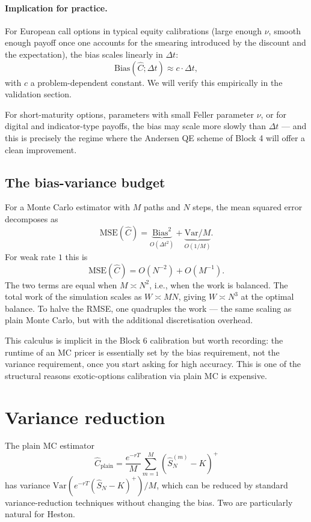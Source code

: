 \documentclass[11pt]{article}
\theoremstyle{plain}
\theoremstyle{definition}
\theoremstyle{remark}
\begin{document}
\paragraph{Implication for practice.} For European call options in typical equity calibrations (large enough $\nu$, smooth enough payoff once one accounts for the smearing introduced by the discount and the expectation), the bias scales linearly in $\Delta t$:
\[
    \mathrm{Bias}(\widehat C; \Delta t) \approx c \cdot \Delta t,
\]
with $c$ a problem-dependent constant. We will verify this empirically in the validation section.

For short-maturity options, parameters with small Feller parameter $\nu$, or for digital and indicator-type payoffs, the bias may scale more slowly than $\Delta t$ --- and this is precisely the regime where the Andersen QE scheme of Block 4 will offer a clean improvement.

\subsection{The bias-variance budget}

For a Monte Carlo estimator with $M$ paths and $N$ steps, the mean squared error decomposes as
\[
    \mathrm{MSE}(\widehat C) = \underbrace{\mathrm{Bias}^2}_{O(\Delta t^2)} + \underbrace{\mathrm{Var}/M}_{O(1/M)}.
\]
For weak rate $1$ this is
\[
    \mathrm{MSE}(\widehat C) = O(N^{-2}) + O(M^{-1}).
\]
The two terms are equal when $M \asymp N^2$, i.e., when the work is balanced. The total work of the simulation scales as $W \asymp M N$, giving $W \asymp N^3$ at the optimal balance. To halve the RMSE, one quadruples the work --- the same scaling as plain Monte Carlo, but with the additional discretisation overhead.

This calculus is implicit in the Block 6 calibration but worth recording: the runtime of an MC pricer is essentially set by the bias requirement, not the variance requirement, once you start asking for high accuracy. This is one of the structural reasons exotic-options calibration via plain MC is expensive.

\section{Variance reduction}

The plain MC estimator
\[
    \widehat C_{\mathrm{plain}} = \frac{e^{-rT}}{M} \sum_{m=1}^M (\hat S^{(m)}_N - K)^+
\]
has variance $\mathrm{Var}(e^{-rT}(\hat S_N - K)^+)/M$, which can be reduced by standard variance-reduction techniques without changing the bias. Two are particularly natural for Heston.
\end{document}
